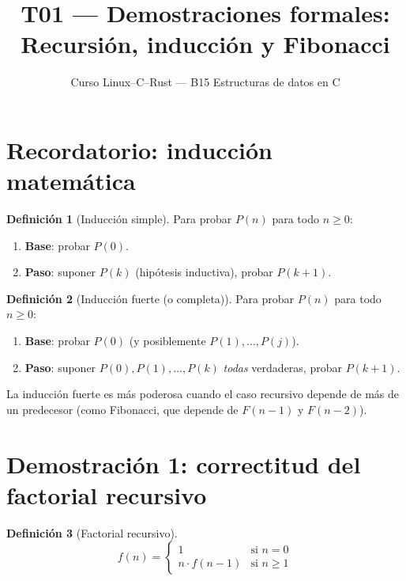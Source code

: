 \documentclass[11pt, letterpaper]{article}
\title{%
  T01 --- Demostraciones formales:\\[4pt]
  Recursión, inducción y Fibonacci
}
\author{Curso Linux--C--Rust --- B15 Estructuras de datos en C}
\date{}
\theoremstyle{definition}
\newtheorem{definition}{Definición}[section]
\theoremstyle{plain}
\theoremstyle{remark}
\begin{document}
\maketitle
\tableofcontents

\section{Recordatorio: inducción matemática}

\begin{definition}[Inducción simple]
Para probar $P(n)$ para todo $n \geq 0$:
\begin{enumerate}
  \item \textbf{Base}: probar $P(0)$.
  \item \textbf{Paso}: suponer $P(k)$ (hipótesis inductiva), probar $P(k+1)$.
\end{enumerate}
\end{definition}

\begin{definition}[Inducción fuerte (o completa)]
Para probar $P(n)$ para todo $n \geq 0$:
\begin{enumerate}
  \item \textbf{Base}: probar $P(0)$ (y posiblemente $P(1), \ldots, P(j)$).
  \item \textbf{Paso}: suponer $P(0), P(1), \ldots, P(k)$ \emph{todas}
    verdaderas, probar $P(k+1)$.
\end{enumerate}
\end{definition}

La inducción fuerte es más poderosa cuando el caso recursivo depende
de más de un predecesor (como Fibonacci, que depende de $F(n-1)$ y
$F(n-2)$).

\section{Demostración 1: correctitud del factorial recursivo}

\begin{definition}[Factorial recursivo]
\[
  f(n) = \begin{cases} 1 & \text{si } n = 0 \\ n \cdot f(n-1) & \text{si } n \geq 1 \end{cases}
\]
\end{definition}
\end{document}
